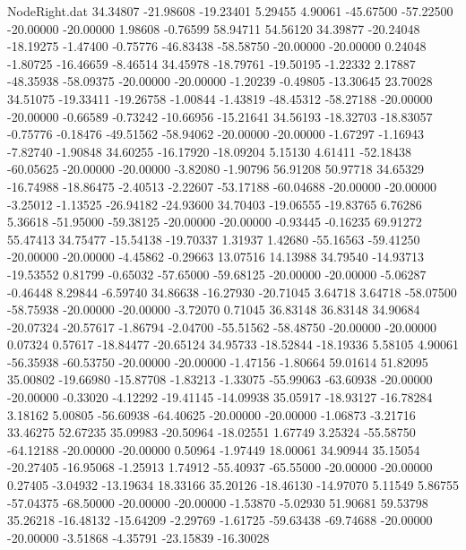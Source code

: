 \begin{filecontents}{NodeRight.dat}
  34.34807  -21.98608  -19.23401     5.29455    4.90061  -45.67500  -57.22500  -20.00000  -20.00000    1.98608   -0.76599   58.94711   54.56120
  34.39877  -20.24048  -18.19275    -1.47400   -0.75776  -46.83438  -58.58750  -20.00000  -20.00000    0.24048   -1.80725  -16.46659   -8.46514
  34.45978  -18.79761  -19.50195    -1.22332    2.17887  -48.35938  -58.09375  -20.00000  -20.00000   -1.20239   -0.49805  -13.30645   23.70028
  34.51075  -19.33411  -19.26758    -1.00844   -1.43819  -48.45312  -58.27188  -20.00000  -20.00000   -0.66589   -0.73242  -10.66956  -15.21641
  34.56193  -18.32703  -18.83057    -0.75776   -0.18476  -49.51562  -58.94062  -20.00000  -20.00000   -1.67297   -1.16943   -7.82740   -1.90848
  34.60255  -16.17920  -18.09204     5.15130    4.61411  -52.18438  -60.05625  -20.00000  -20.00000   -3.82080   -1.90796   56.91208   50.97718
  34.65329  -16.74988  -18.86475    -2.40513   -2.22607  -53.17188  -60.04688  -20.00000  -20.00000   -3.25012   -1.13525  -26.94182  -24.93600
  34.70403  -19.06555  -19.83765     6.76286    5.36618  -51.95000  -59.38125  -20.00000  -20.00000   -0.93445   -0.16235   69.91272   55.47413
  34.75477  -15.54138  -19.70337     1.31937    1.42680  -55.16563  -59.41250  -20.00000  -20.00000   -4.45862   -0.29663   13.07516   14.13988
  34.79540  -14.93713  -19.53552     0.81799   -0.65032  -57.65000  -59.68125  -20.00000  -20.00000   -5.06287   -0.46448    8.29844   -6.59740
  34.86638  -16.27930  -20.71045     3.64718    3.64718  -58.07500  -58.75938  -20.00000  -20.00000   -3.72070    0.71045   36.83148   36.83148
  34.90684  -20.07324  -20.57617    -1.86794   -2.04700  -55.51562  -58.48750  -20.00000  -20.00000    0.07324    0.57617  -18.84477  -20.65124
  34.95733  -18.52844  -18.19336     5.58105    4.90061  -56.35938  -60.53750  -20.00000  -20.00000   -1.47156   -1.80664   59.01614   51.82095
  35.00802  -19.66980  -15.87708    -1.83213   -1.33075  -55.99063  -63.60938  -20.00000  -20.00000   -0.33020   -4.12292  -19.41145  -14.09938
  35.05917  -18.93127  -16.78284     3.18162    5.00805  -56.60938  -64.40625  -20.00000  -20.00000   -1.06873   -3.21716   33.46275   52.67235
  35.09983  -20.50964  -18.02551     1.67749    3.25324  -55.58750  -64.12188  -20.00000  -20.00000    0.50964   -1.97449   18.00061   34.90944
  35.15054  -20.27405  -16.95068    -1.25913    1.74912  -55.40937  -65.55000  -20.00000  -20.00000    0.27405   -3.04932  -13.19634   18.33166
  35.20126  -18.46130  -14.97070     5.11549    5.86755  -57.04375  -68.50000  -20.00000  -20.00000   -1.53870   -5.02930   51.90681   59.53798
  35.26218  -16.48132  -15.64209    -2.29769   -1.61725  -59.63438  -69.74688  -20.00000  -20.00000   -3.51868   -4.35791  -23.15839  -16.30028

\end{filecontents}
